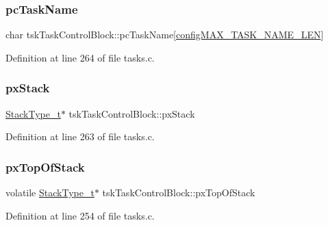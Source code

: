 \subsubsection{\texorpdfstring{pc\+Task\+Name}{pcTaskName}}
{\footnotesize\ttfamily char tsk\+Task\+Control\+Block\+::pc\+Task\+Name\mbox{[}\hyperlink{FreeRTOS_8h_ac388dc4041aab6997348828eb27fc1a8}{config\+M\+A\+X\+\_\+\+T\+A\+S\+K\+\_\+\+N\+A\+M\+E\+\_\+\+L\+EN}\mbox{]}}



Definition at line 264 of file tasks.\+c.

\mbox{\label{structtskTaskControlBlock_a9a0d71a9f95dd0609f9911d9efd79134}} 
\subsubsection{\texorpdfstring{px\+Stack}{pxStack}}
{\footnotesize\ttfamily \hyperlink{pic32mx_2portmacro_8h_a84e9a8ba132feed0b2401c1f4e2ac63c}{Stack\+Type\+\_\+t}$\ast$ tsk\+Task\+Control\+Block\+::px\+Stack}



Definition at line 263 of file tasks.\+c.

\mbox{\label{structtskTaskControlBlock_a429a186c7f8e34aba1eef5e12d215b90}} 
\subsubsection{\texorpdfstring{px\+Top\+Of\+Stack}{pxTopOfStack}}
{\footnotesize\ttfamily volatile \hyperlink{pic32mx_2portmacro_8h_a84e9a8ba132feed0b2401c1f4e2ac63c}{Stack\+Type\+\_\+t}$\ast$ tsk\+Task\+Control\+Block\+::px\+Top\+Of\+Stack}



Definition at line 254 of file tasks.\+c.

\mbox{\label{structtskTaskControlBlock_a79187811e3d2a15595942e3b44237d85}} 
